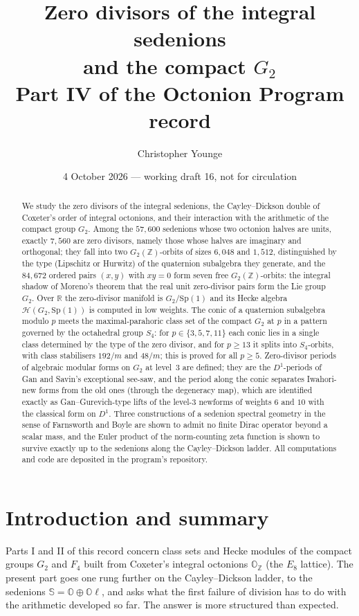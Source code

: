 \documentclass[11pt]{amsart}
\title[Zero divisors of the integral sedenions]{Zero divisors of the integral sedenions\\ and the compact $G_2$\\[4pt] {\normalsize Part IV of the Octonion Program record}}
\author{Christopher Younge}
\date{4 October 2026 --- working draft 16, not for circulation}
\theoremstyle{definition}
\renewcommand{\O}{\mathbb{O}}\newcommand{\Sd}{\mathbb{S}}\newcommand{\Hq}{\mathbb{H}}\newcommand{\Z}{\mathbb{Z}}\newcommand{\Q}{\mathbb{Q}}\newcommand{\R}{\mathbb{R}}\newcommand{\C}{\mathbb{C}}\newcommand{\F}{\mathbb{F}}
\begin{document}
\begin{abstract}
We study the zero divisors of the integral sedenions, the Cayley--Dickson double of Coxeter's order of integral octonions, and their interaction with the arithmetic of the compact group $G_2$. Among the $57{,}600$ sedenions whose two octonion halves are units, exactly $7{,}560$ are zero divisors, namely those whose halves are imaginary and orthogonal; they fall into two $G_2(\Z)$-orbits of sizes $6{,}048$ and $1{,}512$, distinguished by the type (Lipschitz or Hurwitz) of the quaternion subalgebra they generate, and the $84{,}672$ ordered pairs $(x,y)$ with $xy=0$ form seven free $G_2(\Z)$-orbits: the integral shadow of Moreno's theorem that the real unit zero-divisor pairs form the Lie group $G_2$. Over $\R$ the zero-divisor manifold is $G_2/\mathrm{Sp}(1)$ and its Hecke algebra $\mathcal H(G_2,\mathrm{Sp}(1))$ is computed in low weights. The conic of a quaternion subalgebra modulo $p$ meets the maximal-parahoric class set of the compact $G_2$ at $p$ in a pattern governed by the octahedral group $S_4$: for $p\in\{3,5,7,11\}$ each conic lies in a single class determined by the type of the zero divisor, and for $p\ge 13$ it splits into $S_4$-orbits, with class stabilisers $192/m$ and $48/m$; this is proved for all $p\ge 5$. Zero-divisor periods of algebraic modular forms on $G_2$ at level~3 are defined; they are the $D^1$-periods of Gan and Savin's exceptional see-saw, and the period along the conic separates Iwahori-new forms from the old ones (through the degeneracy map), which are identified exactly as Gan--Gurevich-type lifts of the level-$3$ newforms of weights $6$ and $10$ with the classical form on $D^1$. Three constructions of a sedenion spectral geometry in the sense of Farnsworth and Boyle are shown to admit no finite Dirac operator beyond a scalar mass, and the Euler product of the norm-counting zeta function is shown to survive exactly up to the sedenions along the Cayley--Dickson ladder. All computations and code are deposited in the program's repository.
\end{abstract}
\maketitle
\tableofcontents

\section{Introduction and summary}
Parts I and II of this record \cite{PartI,PartII} concern class sets and Hecke modules of the compact groups $G_2$ and $F_4$ built from Coxeter's integral octonions $\O_\Z$ (the $E_8$ lattice). The present part goes one rung further on the Cayley--Dickson ladder, to the sedenions $\Sd=\O\oplus\O\ell$, and asks what the first failure of division has to do with the arithmetic developed so far. The answer is more structured than expected.
\end{document}
